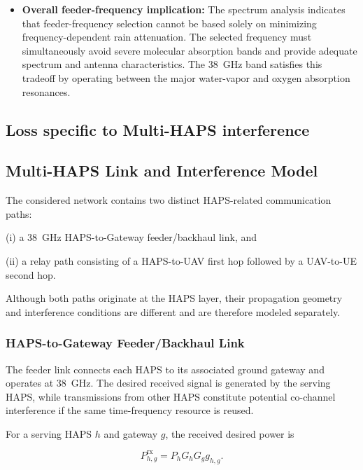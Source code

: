 \documentclass[conference]{IEEEtran}
\begin{document}
\begin{itemize}
    \item \textbf{Overall feeder-frequency implication:}
    The spectrum analysis indicates that feeder-frequency selection cannot be based solely on minimizing frequency-dependent rain attenuation. The selected frequency must simultaneously avoid severe molecular absorption bands and provide adequate spectrum and antenna characteristics. The 38~GHz band satisfies this tradeoff by operating between the major water-vapor and oxygen absorption resonances.
\end{itemize}



\subsection{Loss specific to Multi-HAPS interference}

\label{subsec:multinode-sinr}

\subsection{Multi-HAPS Link and Interference Model}

The considered network contains two distinct HAPS-related communication paths:

(i) a 38~GHz HAPS-to-Gateway feeder/backhaul link, and

(ii) a relay path consisting of a HAPS-to-UAV first hop followed by a UAV-to-UE second hop.

Although both paths originate at the HAPS layer, their propagation geometry and interference conditions are different and are therefore modeled separately.

\subsubsection{HAPS-to-Gateway Feeder/Backhaul Link}

The feeder link connects each HAPS to its associated ground gateway and operates at 38~GHz. The desired received signal is generated by the serving HAPS, while transmissions from other HAPS constitute potential co-channel interference if the same time-frequency resource is reused.

For a serving HAPS $h$ and gateway $g$, the received desired power is

\begin{equation}
P_{h,g}^{\mathrm{rx}} = P_h G_h G_g g_{h,g}.
\end{equation}
\end{document}
